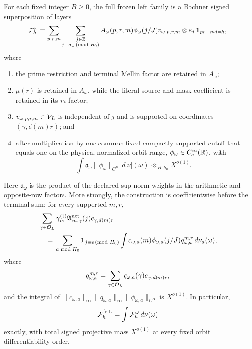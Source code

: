 \begin{proposition}
\label{prop:tpc47-inherited-reassembly}
For each fixed integer \(B\ge0\), the full frozen left family is a
Bochner signed superposition of layers
\begin{equation}
 \mathcal F_h^\omega
 =\sum_{p,r,m}\sum_{\substack{j\in\mathbb Z\\
                      j\equiv a_\omega\!\!\pmod{H_0}}}
 A_\omega(p,r,m)\phi_\omega(j/J)
 v_{\omega,p,r,m}\otimes e_j\,
 \mathbf 1_{pr-mj=h},
 \label{eq:tpc47-projective-layer}
\end{equation}
where
\begin{enumerate}[label=\textup{(\roman*)},leftmargin=2.4em]
 \item the prime restriction and terminal Mellin factor are retained in
       \(A_\omega\);
 \item \(\mu(r)\) is retained in \(A_\omega\), while the literal
       source and mask coefficient is retained in its \(m\)-factor;
 \item \(v_{\omega,p,r,m}\in\mathcal V_L\) is independent of \(j\) and is
       supported on coordinates \((\gamma,d(m)r)\); and
 \item after multiplication by one common fixed compactly supported
       cutoff that equals one on the physical normalized orbit range,
       \(\phi_\omega\in C_c^\infty(\mathbb R)\), with
       \begin{equation}
       \int \mathfrak a_\omega
       \|\phi_\omega\|_{C^B}\,d|\nu|(\omega)
       \ll_{B,h_0}X^{o(1)}.
       \label{eq:tpc47-projective-seminorm-mass}
       \end{equation}
\end{enumerate}
Here \(\mathfrak a_\omega\) is the product of the declared sup-norm
weights in the arithmetic and opposite-row factors.  More strongly,
the construction is coefficientwise before the terminal sum: for every
supported \(m,r\),
\begin{align}
 &\sum_{\gamma\in\mathcal O_L}
 \gamma_m^{(1)}\mathfrak A_{m,\gamma}^{\rm act}(j)
 e_{\gamma,d(m)r}
 \notag\\
 &\quad={}
 \sum_{a\bmod H_0}\mathbf 1_{j\equiv a\!\!\pmod{H_0}}
 \int c_{\omega,a}(m)\phi_{\omega,a}(j/J)
 q_{\omega,a}^{m,r}\,d\nu_a(\omega),
 \label{eq:tpc47-coefficientwise-reassembly}
\end{align}
where
\begin{equation}
 q_{\omega,a}^{m,r}
 =\sum_{\gamma\in\mathcal O_L}q_{\omega,a}(\gamma)
 e_{\gamma,d(m)r},
 \label{eq:tpc47-coefficientwise-output-vector}
\end{equation}
and the integral of
\(\|c_{\omega,a}\|_\infty
  \|q_{\omega,a}\|_\infty
  \|\phi_{\omega,a}\|_{C^B}\)
is \(X^{o(1)}\).  In particular,
\begin{equation}
 \mathcal F_h^{\rm fr,L}=\int\mathcal F_h^\omega\,d\nu(\omega)
 \label{eq:tpc47-full-layer-integral}
\end{equation}
exactly, with total signed projective mass \(X^{o(1)}\) at every fixed
orbit differentiability order.
\end{proposition}

